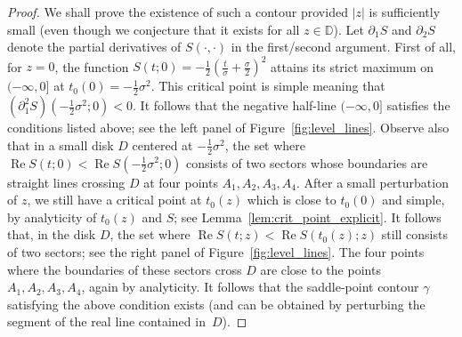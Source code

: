 \documentclass[10pt]{amsart}
\theoremstyle{definition}\newtheorem{defi}[theo]{Definition}\newtheorem{rema}[theo]{Remark}\newtheorem{exam}[theo]{Example}\newtheorem{exem}[theo]{Example}\newtheorem{nota}[theo]{Notation}
\DeclareMathOperator{\Ree}{Re}
\newcommand{\bD}{\mathbb{D}}
\begin{document}
\begin{proof}
We shall prove the existence of such a contour provided $|z|$ is sufficiently small (even though we conjecture that it exists for all $z\in \bD$). Let $\partial_1 S$ and $\partial_2 S$ denote the partial derivatives of $S(\cdot, \cdot)$ in the first/second argument. First of all, for $z=0$, the function $S(t;0) = - \frac 12 (\frac{t}{\sigma} + \frac \sigma 2)^2$ attains its strict maximum on $(-\infty, 0]$ at $t_0(0) = -\frac 12 \sigma^2$. This critical point is simple meaning that $(\partial_1^2 S)(-\frac 12 \sigma^2;0) < 0$. It follows that the negative half-line $(-\infty, 0]$ satisfies the conditions listed above; see the left panel of Figure~\ref{fig:level_lines}. Observe also that in a small disk $D$ centered at $-\frac 12 \sigma^2$, the set where $\Ree S(t;0) < \Ree S(-\frac 12 \sigma^2;0)$ consists of two sectors whose boundaries are straight lines crossing $D$ at four points $A_1, A_2, A_3, A_4$. After a small perturbation of $z$, we still have a critical point at $t_0(z)$ which is close to $t_0(0)$ and simple, by analyticity of $t_0(z)$ and $S$; see Lemma~\ref{lem:crit_point_explicit}. It follows that, in the disk $D$, the set where $\Ree S(t;z) < \Ree S(t_0(z);z)$ still consists of two sectors; see the right panel of Figure~\ref{fig:level_lines}. The four points where the boundaries of these sectors cross $D$ are close to the points $A_1,A_2,A_3,A_4$, again by analyticity. It follows that the saddle-point contour $\gamma$ satisfying the above condition exists (and can be obtained by perturbing the segment of the real line contained in~$D$).



\end{proof}
\end{document}
